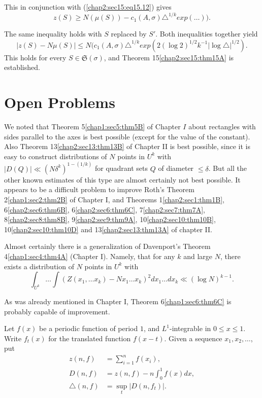This in conjunction with (\ref{chap2:sec15:eq15.12}) gives
$$
z(S) \geq N(\mu(S)) - c_{1}(A, \sigma) \triangle^{1/k} exp (\ldots)).
$$

The same inequality holds with $S$ replaced by $S'$. Both inequalities together yield
$$
|z(S) - N\mu(S)| \leq N(c_{1} (A, \sigma) \triangle^{1/k} exp (2(\log 2)^{1/2} k^{-1} |\log \triangle|^{1/2}).
$$
This holds for every $S \in \mathfrak{S} (\sigma)$, and Theorem 15\ref{chap2:sec15:thm15A} is established.

\section{Open Problems}\label{chap2:sec16}

We noted that Theorem 5\ref{chap1:sec5:thm5B} of Chapter $I$ about rectangles with sides parallel to the axes is best possible (except for the value of the constant). Also Theorem 13\ref{chap2:sec13:thm13B} of Chapter II is best possible, since it is easy to construct distributions of $N$ points in $U^{k}$ with $|D(Q)| \ll (N \delta^{k})^{1-(1/k)}$ for quadrant sets $Q$ of diameter $\leq \delta$. But all the other known estimates of this type are almost certainly not best possible. It appears to be a difficult problem to improve Roth's Theorem 2\ref{chap1:sec2:thm2B} of Chapter I, and Theorems 1\ref{chap2:sec1:thm1B}, 6\ref{chap2:sec6:thm6B}, 6\ref{chap2:sec6:thm6C}, 7\ref{chap2:sec7:thm7A}, 8\ref{chap2:sec8:thm8B}, 9\ref{chap2:sec9:thm9A}, 10\ref{chap2:sec10:thm10B}, 10\ref{chap2:sec10:thm10D} and 13\ref{chap2:sec13:thm13A} of chapter II.

Almost certainly there is a generalization of Davenport's Theorem 4\ref{chap1:sec4:thm4A} (Chapter I). Namely, that for any $k$ and large $N$, there exists a distribution of $N$ points in $U^{k}$ with
$$
\int_{U^{k}} \ldots \int (Z(x_{1}, \ldots x_{k}) - Nx_{1} \ldots x_{k})^{2} dx_{1} \ldots dx_{k} \ll (\log N)^{k-1}.
$$\pageoriginale

As was already mentioned in Chapter I, Theorem 6\ref{chap1:sec6:thm6C} is probably capable of improvement.

Let $f(x)$ be a periodic function of period $1$, and $L^{1}$-integrable in $0 \leq x \leq 1$. Write $f_{t}(x)$ for the translated function $f(x-t)$. Given a sequence $x_{1}, x_{2}, \ldots$, put
\begin{align*}
z(n, f) & = \sum_{i=1}^{n} f(x_{i}),\\
D(n, f) & = z(n, f) - n \int_{0}^{1} f(x) dx,\\
\triangle(n, f) & = \sup_{t} |D(n, f_{t})|.
\end{align*}


